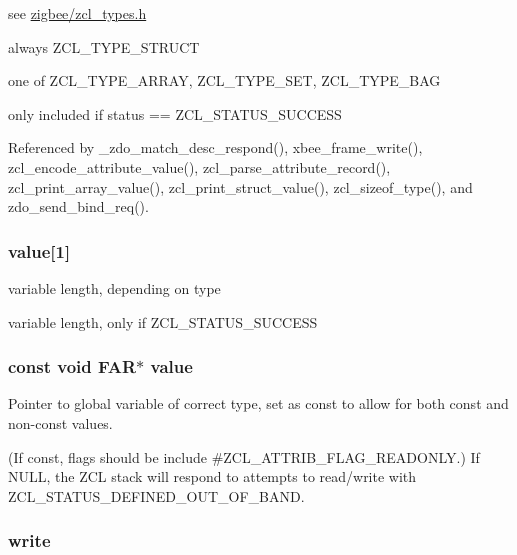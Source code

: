 see \hyperlink{zcl__types_8h}{zigbee/zcl\-\_\-types.\-h} 

always Z\-C\-L\-\_\-\-T\-Y\-P\-E\-\_\-\-S\-T\-R\-U\-C\-T

one of Z\-C\-L\-\_\-\-T\-Y\-P\-E\-\_\-\-A\-R\-R\-A\-Y, Z\-C\-L\-\_\-\-T\-Y\-P\-E\-\_\-\-S\-E\-T, Z\-C\-L\-\_\-\-T\-Y\-P\-E\-\_\-\-B\-A\-G

only included if status == Z\-C\-L\-\_\-\-S\-T\-A\-T\-U\-S\-\_\-\-S\-U\-C\-C\-E\-S\-S 

Referenced by \-\_\-zdo\-\_\-match\-\_\-desc\-\_\-respond(), xbee\-\_\-frame\-\_\-write(), zcl\-\_\-encode\-\_\-attribute\-\_\-value(), zcl\-\_\-parse\-\_\-attribute\-\_\-record(), zcl\-\_\-print\-\_\-array\-\_\-value(), zcl\-\_\-print\-\_\-struct\-\_\-value(), zcl\-\_\-sizeof\-\_\-type(), and zdo\-\_\-send\-\_\-bind\-\_\-req().

\hypertarget{group__zcl_ga1ed5b151a90f7e99af8cca2e6875ddf4}{
\subsubsection[{value}]{ value\mbox{[}1\mbox{]}}}\label{group__zcl_ga1ed5b151a90f7e99af8cca2e6875ddf4}


variable length, depending on type 

variable length, only if Z\-C\-L\-\_\-\-S\-T\-A\-T\-U\-S\-\_\-\-S\-U\-C\-C\-E\-S\-S \hypertarget{group__zcl_gaaaa0b89997c57cfca2dfae40f46e702d}{
\subsubsection[{value}]{\setlength{\rightskip}{0pt plus 5cm}const void {\bf F\-A\-R}$\ast$ value}}\label{group__zcl_gaaaa0b89997c57cfca2dfae40f46e702d}


Pointer to global variable of correct type, set as {\ttfamily const} to allow for both const and non-\/const values. 

(If {\ttfamily const}, flags should be include \#\-Z\-C\-L\-\_\-\-A\-T\-T\-R\-I\-B\-\_\-\-F\-L\-A\-G\-\_\-\-R\-E\-A\-D\-O\-N\-L\-Y.) If N\-U\-L\-L, the Z\-C\-L stack will respond to attempts to read/write with Z\-C\-L\-\_\-\-S\-T\-A\-T\-U\-S\-\_\-\-D\-E\-F\-I\-N\-E\-D\-\_\-\-O\-U\-T\-\_\-\-O\-F\-\_\-\-B\-A\-N\-D. \hypertarget{group__zcl_gac8bd2f85f7df500d34b1d3cd27033a4e}{
\subsubsection[{write}]{ write}}\label{group__zcl_gac8bd2f85f7df500d34b1d3cd27033a4e}


